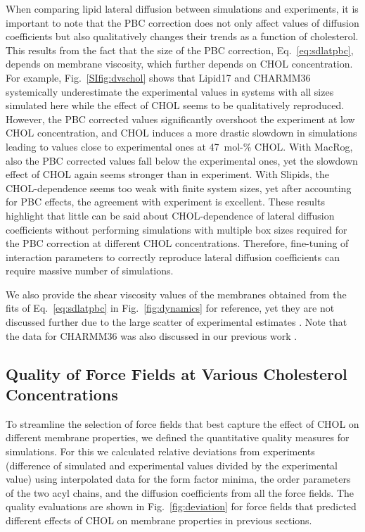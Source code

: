 \documentclass[journal=jctcce]{achemso}
\begin{document}
When comparing lipid lateral diffusion between simulations and experiments, it is important to note that the PBC correction does not only affect values of diffusion coefficients but also qualitatively changes their trends as a function of cholesterol. This results from the fact that the size of the PBC correction, Eq.~\eqref{eq:sdlatpbc}, depends on membrane viscosity, which further depends on CHOL concentration. For example, Fig.~\ref{SIfig:dvschol} shows that Lipid17 and CHARMM36 systemically underestimate the experimental values in systems with all sizes simulated here while the effect of CHOL seems to be qualitatively reproduced. However, the PBC corrected values significantly overshoot the experiment at low CHOL concentration, and CHOL induces a more drastic slowdown in simulations leading to values close to experimental ones at 47~mol-\% CHOL. With MacRog, also the PBC corrected values fall below the experimental ones, yet the slowdown effect of CHOL again seems stronger than in experiment. With Slipids, the CHOL-dependence seems too weak with finite system sizes, yet after accounting for PBC effects, the agreement with experiment is excellent. These results highlight that little can be said about CHOL-dependence of lateral diffusion coefficients without performing simulations with multiple box sizes required for the PBC correction at different CHOL concentrations. Therefore, fine-tuning of interaction parameters to correctly reproduce lateral diffusion coefficients can require massive number of simulations.

We also provide the shear viscosity values of the membranes obtained from the fits of Eq.~\eqref{eq:sdlatpbc} in Fig.~\ref{fig:dynamics} for reference, yet they are not discussed further due to the large scatter of experimental estimates \cite{faizi2022vesicle}. Note that the data for CHARMM36 was also discussed in our previous work \cite{fabian2023protein}.

\subsection{Quality of Force Fields at Various Cholesterol Concentrations}

To streamline the selection of force fields that best capture the effect of CHOL on different membrane properties, we defined the quantitative quality measures for simulations. For this we calculated  relative deviations from experiments (difference of simulated and experimental values divided by the experimental value) using interpolated data for the form factor minima, the order parameters of the two acyl chains, and the diffusion coefficients from all the force fields. The quality evaluations are shown in Fig.~\ref{fig:deviation} for force fields that predicted different effects of CHOL on membrane properties in previous sections.
\end{document}
